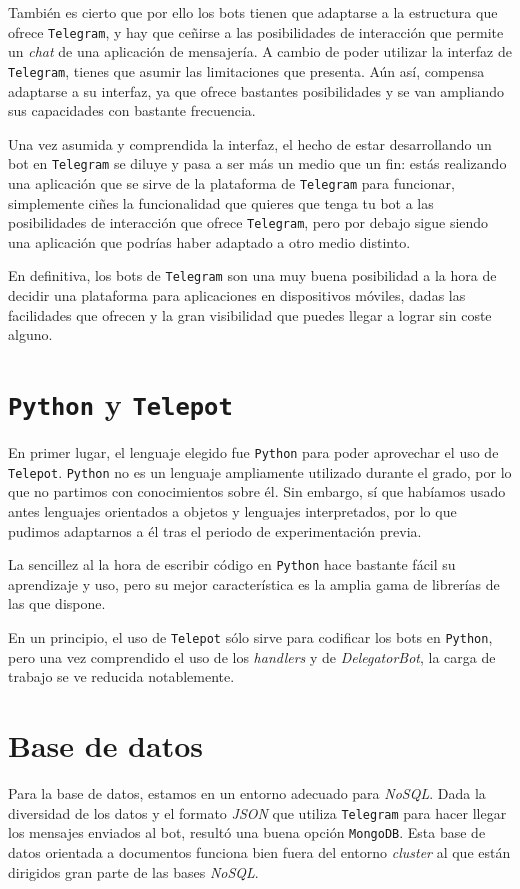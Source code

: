 \documentclass[oneside]{memoir}
\begin{document}
También es cierto que por ello los bots tienen que adaptarse a la estructura que ofrece \texttt{Telegram}, y hay que ceñirse a las posibilidades de interacción que permite un \textit{chat} de una aplicación de mensajería. A cambio de poder utilizar la interfaz de \texttt{Telegram}, tienes que asumir las limitaciones que presenta. Aún así, compensa adaptarse a su interfaz, ya que ofrece bastantes posibilidades y se van ampliando sus capacidades con bastante frecuencia.

Una vez asumida y comprendida la interfaz, el hecho de estar desarrollando un bot en \texttt{Telegram} se diluye y pasa a ser más un medio que un fin: estás realizando una aplicación que se sirve de la plataforma de \texttt{Telegram} para funcionar, simplemente ciñes la funcionalidad que quieres que tenga tu bot a las posibilidades de interacción que ofrece \texttt{Telegram}, pero por debajo sigue siendo una aplicación que podrías haber adaptado a otro medio distinto.

En definitiva, los bots de \texttt{Telegram} son una muy buena posibilidad a la hora de decidir una plataforma para aplicaciones en dispositivos móviles, dadas las facilidades que ofrecen y la gran visibilidad que puedes llegar a lograr sin coste alguno.

\section{\texttt{Python} y \texttt{Telepot}}
En primer lugar, el lenguaje elegido fue \texttt{Python} para poder aprovechar el uso de \texttt{Telepot}. \texttt{Python} no es un lenguaje ampliamente utilizado durante el grado, por lo que no partimos con conocimientos sobre él. Sin embargo, sí que habíamos usado antes lenguajes orientados a objetos y lenguajes interpretados, por lo que pudimos adaptarnos a él tras el periodo de experimentación previa.

La sencillez al la hora de escribir código en \texttt{Python} hace bastante fácil su aprendizaje y uso, pero su mejor característica es la amplia gama de librerías de las que dispone.

En un principio, el uso de \texttt{Telepot} sólo sirve para codificar los bots en \texttt{Python}, pero una vez comprendido el uso de los \textit{handlers} y de \textit{DelegatorBot}, la carga de trabajo se ve reducida notablemente. 

\section{Base de datos}
Para la base de datos, estamos en un entorno adecuado para \textit{NoSQL}. Dada la diversidad de los datos y el formato \textit{JSON} que utiliza \texttt{Telegram} para hacer llegar los mensajes enviados al bot, resultó una buena opción \texttt{MongoDB}. Esta base de datos orientada a documentos funciona bien fuera del entorno \textit{cluster} al que están dirigidos gran parte de las bases \textit{NoSQL}.
\end{document}
